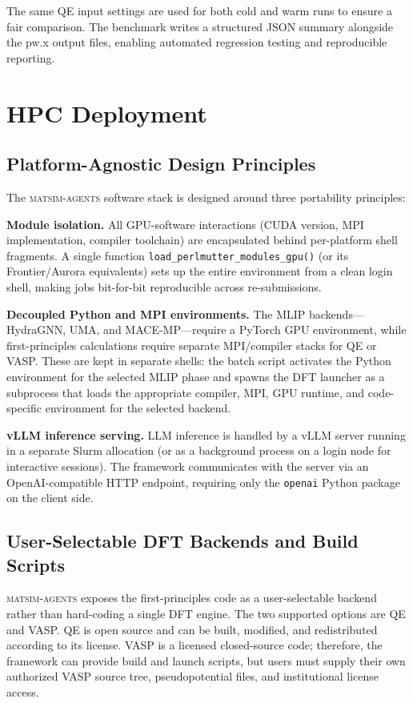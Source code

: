 \documentclass[conference]{IEEEtran}
\def\ac#1{#1}%
\def\acs#1{#1}%
\begin{document}
The same \acs{QE} input settings are used for both cold and warm runs to ensure a
fair comparison. The benchmark writes a structured \ac{JSON} summary alongside the
pw.x output files, enabling automated regression testing and reproducible
reporting.

\section{HPC Deployment}
\label{sec:hpc}

\subsection{Platform-Agnostic Design Principles}
The \textsc{matsim-agents} software stack is designed around three portability
principles:

\textbf{Module isolation.} All \acs{GPU}-software interactions (\acs{CUDA} version, \acs{MPI}
implementation, compiler toolchain) are encapsulated behind per-platform shell
fragments. A single function \texttt{load\_perlmutter\_modules\_gpu()} (or its
Frontier/Aurora equivalents) sets up the entire environment from a clean login
shell, making jobs bit-for-bit reproducible across re-submissions.

\textbf{Decoupled Python and \ac{MPI} environments.} The \acs{MLIP} backends---HydraGNN,
UMA, and MACE-MP---require a PyTorch \acs{GPU} environment, while first-principles calculations require separate
\acs{MPI}/compiler stacks for \acs{QE} or \acs{VASP}. These are kept in separate shells: the batch
script activates the Python environment for the selected \acs{MLIP} phase and spawns the
\acs{DFT} launcher as a subprocess that loads the appropriate compiler, \acs{MPI}, \acs{GPU}
runtime, and code-specific environment for the selected backend.

\textbf{vLLM inference serving.} \acs{LLM} inference is handled by a vLLM server
running in a separate Slurm allocation (or as a background process on a login
node for interactive sessions). The framework communicates with the server via
an OpenAI-compatible \ac{HTTP} endpoint, requiring only the \texttt{openai} Python
package on the client side.

\subsection{User-Selectable DFT Backends and Build Scripts}
\textsc{matsim-agents} exposes the first-principles code as a user-selectable
backend rather than hard-coding a single \acs{DFT} engine. The two supported options
are \acs{QE} and \acs{VASP}. \acs{QE} is open source and can be built,
modified, and redistributed according to its license. \acs{VASP} is a licensed
closed-source code; therefore, the framework can provide build and launch
scripts, but users must supply their own authorized \acs{VASP} source tree,
pseudopotential files, and institutional license access.
\end{document}
